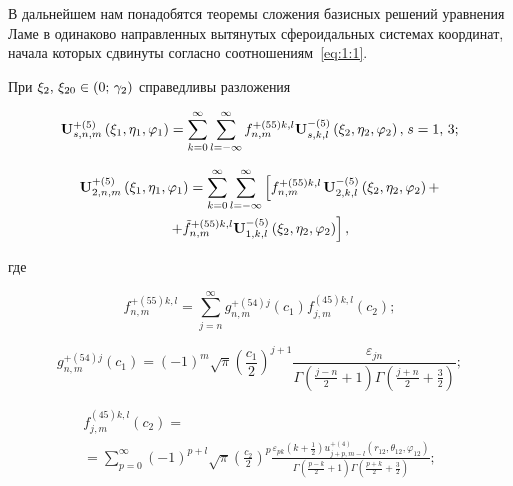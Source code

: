 \begin{russian}
В дальнейшем нам понадобятся теоремы сложения базисных решений уравнения Ламе в одинаково направленных вытянутых сфероидальных системах координат, начала которых сдвинуты согласно соотношениям~\eqref{eq:1:1}.

\begin{theorem}
При ${\xi _2},{\mkern 1mu} {\kern 1pt} {\xi _{20}} \in (0;{\mkern 1mu} {\kern 1pt} {\gamma _2})$ справедливы разложения

\begin{equation}\label{eq:1:46}
{\bf{U}}_{s,n,m}^{ + (5)}\left( {{\xi _1},{\eta _1},{\varphi _1}} \right) = \sum\limits_{k = 0}^\infty  {\sum\limits_{l =  - \infty }^\infty  {f_{n,m}^{ + (55)k,l}} } {\bf{U}}_{s,k,l}^{ - (5)}\left( {{\xi _2},{\eta _2},{\varphi _2}} \right), {\kern 1pt} s = 1,{\mkern 1mu} {\kern 1pt} 3;
\end{equation}

\begin{multline}\label{eq:1:47}
{\bf{U}}_{2,n,m}^{ + (5)}\left( {{\xi _1},{\eta _1},{\varphi _1}} \right) = \sum\limits_{k = 0}^\infty  {\sum\limits_{l =  - \infty }^\infty  {\left[ {f_{n,m}^{ + (55)k,l}} \right.} } {\bf{U}}_{2,k,l}^{ - (5)}\left( {{\xi _2},{\eta _2},{\varphi _2}} \right) + \\
\left. { + \tilde f_{n,m}^{ + (55)k,l}{\bf{U}}_{1,k,l}^{ - (5)}\left( {{\xi _2},{\eta _2},{\varphi _2}} \right)} \right],
\end{multline}

\noindent где

\begin{equation}\label{eq:1:48}
f_{n,m}^{ + (55)k,l} = \sum\limits_{j = n}^\infty  {g_{n,m}^{ + (54)j}} ({c_1})f_{j,m}^{(45)k,l}({c_2});
\end{equation}

\begin{equation}\label{eq:1:49}
g_{n,m}^{ + (54)j}({c_1}) = {( - 1)^m}\sqrt \pi  {\left( {\frac{{{c_1}}}{2}} \right)^{j + 1}}\frac{{{\varepsilon _{jn}}}}{{\Gamma \left( {\frac{{j - n}}{2} + 1} \right)\Gamma \left( {\frac{{j + n}}{2} + \frac{3}{2}} \right)}};
\end{equation}

\begin{multline}\label{eq:1:50}
f_{j,m}^{(45)k,l}({c_2}) = \\
= \sum\limits_{p = 0}^\infty  {{{( - 1)}^{p + l}}} \sqrt \pi  {\left( {\frac{{{c_2}}}{2}} \right)^p}\frac{{{\varepsilon _{pk}}\left( {k + \frac{1}{2}} \right)u_{j + p,m - l}^{ + (4)}\left( {{r_{12}},{\theta _{12}},{\varphi _{12}}} \right)}}{{\Gamma \left( {\frac{{p - k}}{2} + 1} \right)\Gamma \left( {\frac{{p + k}}{2} + \frac{3}{2}} \right)}};
\end{multline}


\end{theorem}
\end{russian}
